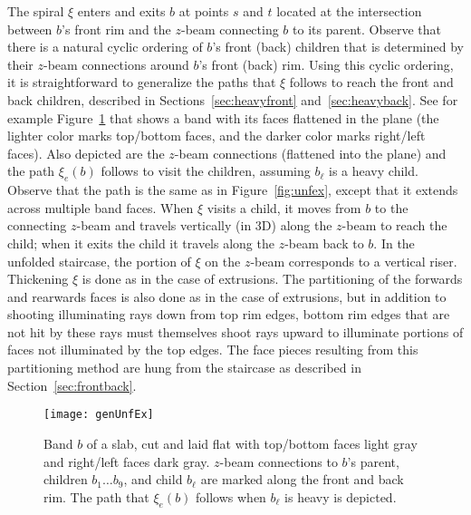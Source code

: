 \documentclass[11pt]{article}
\begin{document}
The spiral $\xi$ enters and exits $b$ at points $s$ and $t$
located at the intersection between $b$'s front rim and the $z$-beam
connecting $b$ to its parent.
Observe that there is a natural cyclic ordering of $b$'s front (back) children that is determined by their
$z$-beam connections around $b$'s front (back) rim.  Using this cyclic ordering, it
is straightforward to generalize the paths that $\xi$ follows to reach the
front and back children, described in Sections~\ref{sec:heavyfront} and~\ref{sec:heavyback}.
See for example Figure~\ref{fig:genUnfEx} that shows a band with its faces flattened in the plane (the lighter color marks top/bottom faces, and
the darker color marks right/left faces). Also depicted are
the $z$-beam connections (flattened into the plane) and the path $\xi_e(b)$  follows
to visit the children, assuming $b_\ell$ is a heavy child. Observe that the path is
the same as in Figure~\ref{fig:unfex}, except that it extends across multiple band faces.
When $\xi$ visits a child, it moves from $b$ to
the connecting $z$-beam and travels vertically (in 3D) along the $z$-beam to reach the child;
when it exits the child it travels along the $z$-beam back to $b$.
In the unfolded staircase, the portion
of $\xi$ on the $z$-beam corresponds to a vertical riser. Thickening $\xi$ is done
as in the case of extrusions. The partitioning of the
forwards and rearwards faces is also done as in the case of extrusions, but
in addition to shooting illuminating rays down from top rim edges, bottom rim edges that are not hit by these rays must
themselves shoot rays upward to illuminate portions of faces not illuminated by
the top edges. The face pieces resulting from this partitioning method
are hung from the staircase as described in Section~\ref{sec:frontback}. \begin{figure}[htbp]
\centering
\texttt{[image: genUnfEx]}
\caption{Band $b$ of a slab, cut and laid flat with top/bottom faces light gray and right/left
faces dark gray. $z$-beam connections to $b$'s parent, children $b_1 \dots b_9$, and child $b_\ell$
are marked along the front and back rim. The path that $\xi_e(b)$ follows
when $b_\ell$ is heavy is depicted.}
\label{fig:genUnfEx}
\end{figure}
\end{document}

